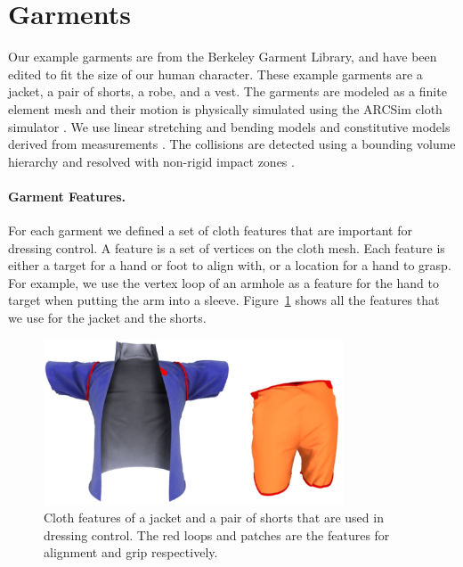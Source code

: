 \section{Garments}

Our example garments are from the Berkeley Garment Library, and have been
edited to fit the size of our human character.  These example garments
are a jacket, a pair of shorts, a robe, and a vest.
The garments are modeled as a finite element mesh and their motion is
physically simulated
using the ARCSim cloth simulator \cite{Narain:2012:AAR}. We use linear
stretching and bending models and constitutive models derived from
measurements \cite{Wang:2011}. The collisions are detected using a
bounding volume hierarchy \cite{Tang:2010} and resolved with non-rigid
impact zones \cite{Harmon:2008}.

\paragraph{Garment Features.} For each garment we defined a set of cloth
features that are important for dressing control. A feature is a set of
vertices on the cloth mesh.  Each feature is either a target for a hand or
foot to align with, or a location for a hand to grasp.  For example, we
use the vertex loop of an armhole as a feature for the hand to target when
putting the arm into a sleeve.  Figure~\ref{fig:features} shows all the
features that we use for the jacket and the shorts.

\begin{figure}[!t]
  \centering
  \includegraphics[width=3.5in]{images/features}
  \caption{Cloth features of a jacket and a pair of shorts that are used in dressing control. The red loops and patches are the features for alignment and grip respectively.}
  \label{fig:features}
\end{figure}

